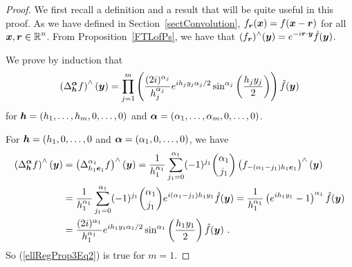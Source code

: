 \begin{proof}
We first recall a definition and a result that will be quite useful in
this proof.  As we have defined in Section~\ref{sectConvolution},
$f_{{\bm{r}}}({\bm{x}}) = f({\bm{x}}- {\bm{r}})$ for all
$\displaystyle {\bm{x}},{\bm{r}} \in \mathbb{R}^n$.
From Proposition~\ref{FTLofPs}, we have that
$\displaystyle (f_{{\bm{r}}})^\wedge({\bm{y}}) =
e^{-i {\bm{r}}\cdot{\bm{y}}} \hat{f}({\bm{y}})$.

We prove by induction that
\begin{equation} \label{ellRegProp3Eq2}
\left(\Delta^{{\bm{\alpha}}}_{{\bm{h}}} f\right)^\wedge({\bm{y}})
= \prod_{j=1}^m \left(\frac{(2i)^{\alpha_j}}
{h_j^{\alpha_j}} e^{i h_j y_j \alpha_j/2}
\sin^{\alpha_j}\left(\frac{h_j y_j}{2}\right) \right)\hat{f}({\bm{y}})
\end{equation}
for ${\bm{h}} = (h_1,\ldots,h_m,0,\ldots,0)$ and
${\bm{\alpha}} = (\alpha_1,\ldots,\alpha_m,0,\ldots,0)$.

For ${\bm{h}} = (h_1,0,\ldots,0$ and ${\bm{\alpha}} = (\alpha_1,0,\ldots,0)$,
we have
\begin{align*}
\left(\Delta^{{\bm{\alpha}}}_{{\bm{h}}} f \right)^\wedge({\bm{y}})
&= \left(\Delta^{\alpha_1}_{h_1 {\bm{e}}_1} f \right)^\wedge({\bm{y}})
= \frac{1}{h_1^{\alpha_1}} \sum_{j_1=0}^{\alpha_1} (-1)^{j_1}
\binom{\alpha_1}{j_1}
\left(f_{-(\alpha_1-j_1)h_1 {\bm{e}}_1}\right)^\wedge({\bm{y}}) \\
&= \frac{1}{h_1^{\alpha_1}} \sum_{j_1=0}^{\alpha_1} (-1)^{j_1}
\binom{\alpha_1}{j_1} e^{i(\alpha_1-j_1) h_1 y_1} \hat{f}({\bm{y}})
= \frac{1}{h_1^{\alpha_1}} \left(e^{i h_1 y_1} - 1\right)^{\alpha_1}
\hat{f}({\bm{y}}) \\
&= \frac{(2i)^{\alpha_1}}{h_1^{\alpha_1}} e^{i h_1 y_1 \alpha_1/2}
\sin^{\alpha_1}\left(\frac{h_1 y_1}{2}\right) \hat{f}({\bm{y}}) \ .
\end{align*}
So (\ref{ellRegProp3Eq2}) is true for $m=1$.


\end{proof}
